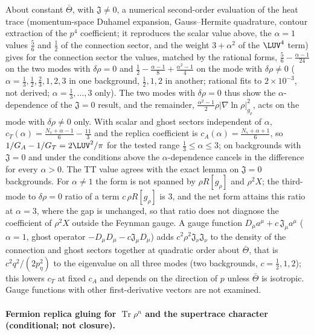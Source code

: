 About constant \(\bar\Theta\), with \(\mathfrak J\neq0\), a numerical second-order evaluation of the heat trace (momentum-space Duhamel expansion, Gauss--Hermite quadrature, contour extraction of the \(p^4\) coefficient; it reproduces the scalar value above, the \(\alpha=1\) values \(\tfrac56\) and \(\tfrac12\) of the connection sector, and the weight \(3+\alpha^2\) of the \(\LUV^4\) term) gives for the connection sector the values, matched by the rational forms, \(\tfrac56-\tfrac{\alpha-1}{24}\) on the two modes with \(\delta\rho=0\) and \(\tfrac12-\tfrac{\alpha-1}8+\tfrac{\alpha^2-1}4\) on the mode with \(\delta\rho\neq0\) (\(\alpha=\tfrac13,\tfrac12,\tfrac23,1,2,3\) in one background, \(\tfrac12,1,2\) in another; rational fits to \(2\times10^{-3}\), not derived; \(\alpha=\tfrac13,\dots,3\) only). The two modes with \(\delta\rho=0\) thus show the \(\alpha\)-dependence of the \(\mathfrak J=0\) result, and the remainder, \(\tfrac{\alpha^2-1}2\rho|\nabla\ln\rho|^2_{g_\rho}\), acts on the mode with \(\delta\rho\neq0\) only. With scalar and ghost sectors independent of \(\alpha\), \(c_T(\alpha)=\tfrac{N_s+\alpha-1}6-\tfrac{11}3\) and the replica coefficient is \(c_A(\alpha)=\tfrac{N_s+\alpha+1}6\), so \(1/G_A-1/G_T=2\LUV^2/\pi\) for the tested range \(\tfrac13\le\alpha\le3\); on backgrounds with \(\mathfrak J=0\) and under the conditions above the \(\alpha\)-dependence cancels in the difference for every \(\alpha>0\). The TT value agrees with the exact lemma on \(\mathfrak J=0\) backgrounds. For \(\alpha\neq1\) the form is not spanned by \(\rho R[g_\rho]\) and \(\rho^2X\); the third-mode to \(\delta\rho=0\) ratio of a term \(c\,\rho R[g_\rho]\) is \(3\), and the net form attains this ratio at \(\alpha=3\), where the gap is unchanged, so that ratio does not diagnose the coefficient of \(\rho^2X\) outside the Feynman gauge. A gauge function \(D_\mu a^\mu+c\,\mathfrak J_\mu a^\mu\) (\(\alpha=1\), ghost operator \(-D_\mu D_\mu-c\mathfrak J_\mu D_\mu\)) adds \(c^2\rho^2\mathfrak J_\nu\mathfrak J_\nu\) to the density of the connection and ghost sectors together at quadratic order about \(\bar\Theta\), that is \(c^2q^2/(2p_\eta^2)\) to the eigenvalue on all three modes (two backgrounds, \(c=\tfrac12,1,2\)); this lowers \(c_T\) at fixed \(c_A\) and depends on the direction of \(p\) unless \(\bar\Theta\) is isotropic. Gauge functions with other first-derivative vectors are not examined.





\paragraph{Fermion replica gluing for \(\operatorname{Tr}\rho^n\) and the supertrace character (conditional; not closure).} \label{detail:sec-B-paragraphfermionreplicagluingf-5}

